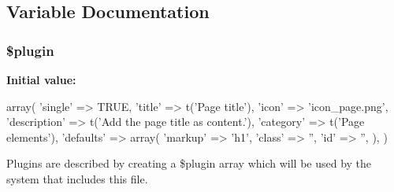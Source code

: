 \subsection{Variable Documentation}
\hypertarget{page__title_8inc_ada8a7130088351710bb02ed622d6bf65}{
\subsubsection[{\$plugin}]{\setlength{\rightskip}{0pt plus 5cm}\$plugin}}
\label{page__title_8inc_ada8a7130088351710bb02ed622d6bf65}
{\bfseries Initial value:}
\begin{DoxyCode}
 array(
  'single' => TRUE,
  'title' => t('Page title'),
  'icon' => 'icon_page.png',
  'description' => t('Add the page title as content.'),
  'category' => t('Page elements'),
  'defaults' => array(
    'markup' => 'h1',
    'class' => '',
    'id' => '',
  ),
)
\end{DoxyCode}
Plugins are described by creating a \$plugin array which will be used by the system that includes this file. 